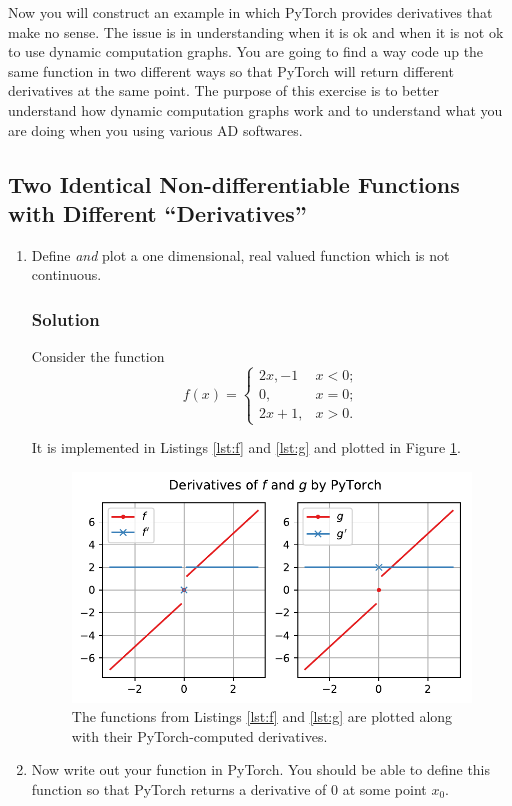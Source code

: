 \documentclass[letterpaper,11pt]{article}
\begin{document}
Now you will construct an example in which PyTorch provides derivatives that
make no sense. The issue is in understanding when it is ok and when it is not ok
to use dynamic computation graphs. You are going to find a way code up the same
function in two different ways so that PyTorch will return different derivatives
at the same point. The purpose of this exercise is to better understand how
dynamic computation graphs work and to understand what you are doing when you
using various AD softwares.

\subsection*{Two Identical Non-differentiable Functions with Different ``Derivatives''}

\begin{enumerate}
\item Define \emph{and} plot a one dimensional, real valued function
  which is not continuous.
  
  \subsubsection*{Solution}
  Consider the function
  \begin{equation}
    f(x) = \begin{cases}
      2x, - 1& x < 0; \\
      0, & x = 0; \\
      2x + 1, & x > 0.
    \end{cases}
    \label{eqn:problem4}
  \end{equation}

  It is implemented in Listings \ref{lst:f} and \ref{lst:g} and plotted in
  Figure \ref{fig:problem4}.

  \begin{figure}[h]
    \centering
    \includegraphics{problem4/problem4.pdf}
    \caption{The functions from Listings \ref{lst:f} and \ref{lst:g} are plotted
      along with their PyTorch-computed derivatives.}
    \label{fig:problem4}
  \end{figure}
\item Now write out your function in PyTorch. You should be able to
  define this function so that PyTorch returns a derivative of $0$ at
  some point $x_0$.

\end{enumerate}
\end{document}
